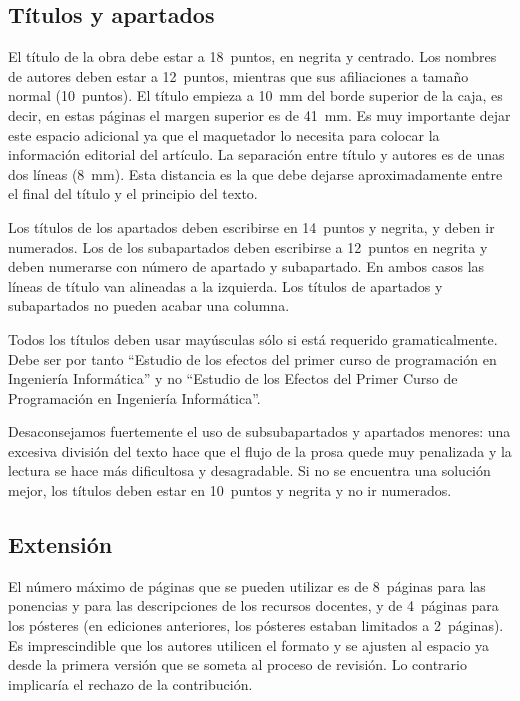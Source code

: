 \documentclass[twocolumn,twoside,a4paper, 10pt]{article}
\begin{document}
\subsection{Títulos y apartados}

El título de la obra debe estar a 18~puntos, en negrita y centrado.
Los nombres de autores deben estar a 12~puntos, mientras que sus
afiliaciones a tamaño normal (10~puntos).  El título empieza a 10~mm
del borde superior de la caja, es decir, en estas páginas el margen
superior es de 41~mm. Es muy importante dejar este espacio adicional 
ya que el maquetador lo necesita para colocar la información 
editorial del artículo.  La separación entre título y autores es de unas
dos líneas (8~mm).  Esta distancia es la que debe dejarse
aproximadamente entre el final del título y el principio del texto. 

Los títulos de los apartados deben escribirse en 14~puntos y negrita, y 
deben ir numerados. Los de los subapartados deben escribirse a 12~puntos 
en negrita y deben numerarse con número de apartado y 
subapartado. En ambos casos las líneas de título van alineadas a la 
izquierda. Los títulos de apartados y subapartados no pueden acabar 
una columna.

Todos los títulos deben usar mayúsculas sólo si está requerido
gramaticalmente.  Debe ser por tanto ``Estudio de los efectos del
primer curso de programación en Ingeniería Informática'' y no
``Estudio de los Efectos del Primer Curso de Programación en
Ingeniería Informática''.

Desaconsejamos fuertemente el uso de subsubapartados y apartados
menores: una excesiva división del texto hace que el flujo de la prosa
quede muy penalizada y la lectura se hace más dificultosa y
desagradable.  Si no se encuentra una solución mejor, los títulos
deben estar en 10~puntos y negrita y no ir numerados.

\subsection{Extensión}

El número máximo de páginas que se pueden utilizar es de 8~páginas para las ponencias 
y para las descripciones de los recursos docentes, y de 4~páginas para los pósteres 
(en ediciones anteriores, los pósteres estaban limitados a 2~páginas). 
Es imprescindible que los autores utilicen el formato y se ajusten al espacio ya 
desde la primera versión que se someta al proceso de revisión. Lo contrario implicaría 
el rechazo de la contribución.
\end{document}
